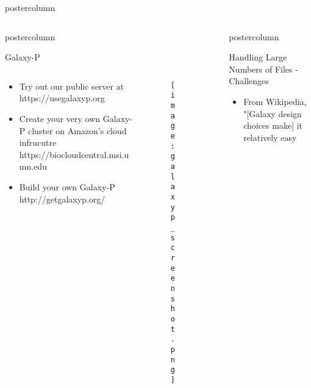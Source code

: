 \documentclass[final]{beamer}
\newlength{\innercolheight}
\begin{document}
\begin{frame}
\begin{columns}
\begin{column}{.67\textwidth}
\begin{beamercolorbox}[center,wd=\textwidth]{postercolumn}
\begin{minipage}[T]{.98\textwidth}
{\begin{columns}
\begin{column}{.39\textwidth}
\begin{beamercolorbox}[center,wd=\textwidth]{postercolumn}
\begin{minipage}[T]{\textwidth}
{\begin{block}{Galaxy-P}
                          \begin{columns}
                            \begin{column}{.59\textwidth}
                              \begin{itemize}
                                \item Try out our public server at https://usegalaxyp.org
                                \item Create your very own Galaxy-P cluster on Amazon's cloud infrucutre https://biocloudcentral.msi.umn.edu
                                \item Build your own Galaxy-P http://getgalaxyp.org/
                              \end{itemize}
                            \end{column}
                            \begin{column}{.4\textwidth}
                              \begin{figure}
                                \texttt{[image: galaxyp\_screenshot.png]}
                              \end{figure}
                            \end{column}
                          \end{columns}            
                        \end{block}
                        \vfill
                      }
                    \end{minipage}
                  \end{beamercolorbox}
                \end{column}
                \begin{column}{.01\textwidth}
                \hfill
                \end{column}
                \begin{column}{.60\textwidth}
                  \begin{beamercolorbox}[center,wd=\textwidth]{postercolumn}
                    \begin{minipage}[T]{\textwidth} %
                      \parbox[t][\innercolheight]{\textwidth}{
                        \begin{block}{Handling Large Numbers of Files - Challenges}
                          \begin{itemize}
                          \item From Wikipedia, "[Galaxy design choices make] it relatively easy

\end{itemize}
\end{block}}
\end{minipage}
\end{beamercolorbox}
\end{column}
\end{columns}}
\end{minipage}
\end{beamercolorbox}
\end{column}
\end{columns}
\end{frame}
\end{document}
